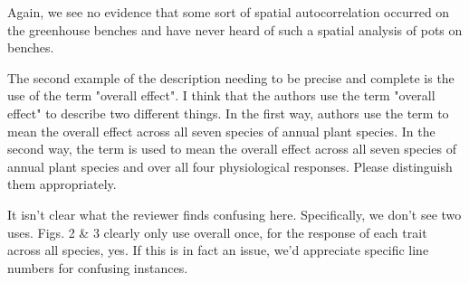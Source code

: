 \documentclass[parskip=half]{scrartcl}
\newcommand{\AR}[1]
	{\color{PineGreen}#1\color{black} \par }
\begin{document}
\AR{Again, we see no evidence that some sort of spatial autocorrelation occurred on the greenhouse benches and have never heard of such a spatial analysis of pots on benches.}

The second example of the description needing to be precise and complete is the use of the term "overall effect". I think that the authors use the term "overall effect" to describe two different things. In the first way, authors use the term to mean the overall effect across all seven species of annual plant species. In the second way, the term is used to mean the overall effect across all seven species of annual plant species and over all four physiological responses. Please distinguish them appropriately.

\AR{It isn't clear what the reviewer finds confusing here. Specifically, we don't see two uses. Figs. 2 \& 3 clearly only use overall once, for the response of each trait across all species, yes. If this is in fact an issue, we'd appreciate specific line numbers for confusing instances.} 
\end{document}
